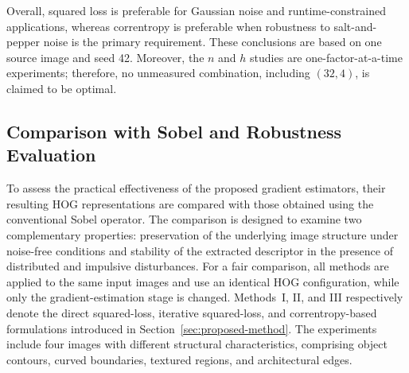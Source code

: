 \documentclass{elsarticle}
\begin{document}
Overall, squared loss is preferable for Gaussian noise and
runtime-constrained applications, whereas correntropy is preferable when
robustness to salt-and-pepper noise is the primary requirement. These
conclusions are based on one source image and seed 42. Moreover, the $n$ and
$h$ studies are one-factor-at-a-time experiments; therefore, no unmeasured
combination, including $(32,4)$, is claimed to be optimal.



\FloatBarrier
\subsection{Comparison with Sobel and Robustness Evaluation}
To assess the practical effectiveness of the proposed gradient estimators,
their resulting HOG representations are compared with those obtained using
the conventional Sobel operator. The comparison is designed to examine two
complementary properties: preservation of the underlying image structure
under noise-free conditions and stability of the extracted descriptor in
the presence of distributed and impulsive disturbances. For a fair
comparison, all methods are applied to the same input images and use an
identical HOG configuration, while only the gradient-estimation stage is
changed. Methods~I, II, and III respectively denote the direct squared-loss,
iterative squared-loss, and correntropy-based formulations introduced in
Section~\ref{sec:proposed-method}. The experiments include four images with
different structural characteristics, comprising object contours, curved
boundaries, textured regions, and architectural edges.
\end{document}
